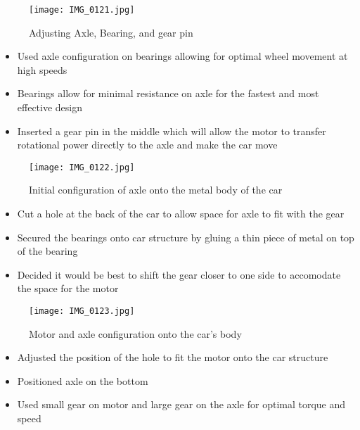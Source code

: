 \documentclass[12pt]{article}
\begin{document}
\begin{figure}[H]
    \centering
    \texttt{[image: IMG\_0121.jpg]}
    \caption{ Adjusting Axle, Bearing, and gear pin}
    \label{fig:enter-label}
\end{figure}

\begin{itemize}
    \item Used axle configuration on bearings allowing for optimal wheel movement at high speeds
    \item Bearings allow for minimal resistance on axle for the fastest and most effective design
    \item Inserted a gear pin in the middle which will allow the motor to transfer rotational power directly to the axle and make the car move
  \end{itemize}


\begin{figure}[H]
    \centering
    \texttt{[image: IMG\_0122.jpg]}
    \caption{Initial configuration of axle onto the metal body of the car}
    \label{fig:enter-label}
\end{figure}

\begin{itemize}
    \item Cut a hole at the back of the car to allow space for axle to fit with the gear
    \item Secured the bearings onto car structure by gluing a thin piece of metal on top of the bearing
    \item Decided it would be best to shift the gear closer to one side to accomodate the space for the motor
  \end{itemize}


\begin{figure}[H]
    \centering
    \texttt{[image: IMG\_0123.jpg]}
    \caption{Motor and axle configuration onto the car's body}
    \label{fig:enter-label}
\end{figure}

\begin{itemize}
    \item Adjusted the position of the hole to fit the motor onto the car structure
    \item Positioned axle on the bottom
    \item Used small gear on motor and large gear on the axle for optimal torque and speed 
  \end{itemize}
\end{document}
